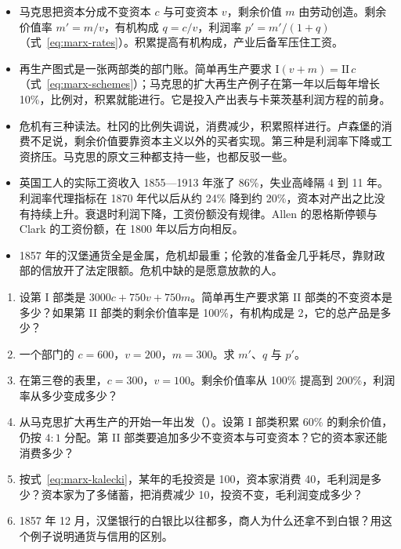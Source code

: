\begin{takeaways}
\begin{itemize}
\item 马克思把资本分成不变资本 $c$ 与可变资本 $v$，剩余价值 $m$ 由劳动创造。剩余价值率 $m'=m/v$，有机构成 $q=c/v$，利润率 $p'=m'/(1+q)$（式~\eqref{eq:marx-rates}）。积累提高有机构成，产业后备军压住工资。
\item 再生产图式是一张两部类的部门账。简单再生产要求 $\text{I}(v+m)=\text{II}\,c$（式~\eqref{eq:marx-schemes}）；马克思的扩大再生产例子在第一年以后每年增长 10\%，比例对，积累就能进行。它是投入产出表与卡莱茨基利润方程的前身。
\item 危机有三种读法。杜冈的比例失调说，消费减少，积累照样进行。卢森堡的消费不足说，剩余价值要靠资本主义以外的买者实现。第三种是利润率下降或工资挤压。马克思的原文三种都支持一些，也都反驳一些。
\item 英国工人的实际工资收入 1855—1913 年涨了 86\%，失业高峰隔 4 到 11 年。利润率代理指标在 1870 年代以后从约 24\% 降到约 20\%，资本对产出之比没有持续上升。衰退时利润下降，工资份额没有规律。Allen 的恩格斯停顿与 Clark 的工资份额，在 1800 年以后方向相反。
\item 1857 年的汉堡通货全是金属，危机却最重；伦敦的准备金几乎耗尽，靠财政部的信放开了法定限额。危机中缺的是愿意放款的人。
\end{itemize}
\end{takeaways}

\begin{selfcheck}
\begin{enumerate}
\item 设第 I 部类是 $3000c+750v+750m$。简单再生产要求第 II 部类的不变资本是多少？如果第 II 部类的剩余价值率是 100\%，有机构成是 2，它的总产品是多少？
\item 一个部门的 $c=600$，$v=200$，$m=300$。求 $m'$、$q$ 与 $p'$。
\item 在第三卷的表里，$c=300$，$v=100$。剩余价值率从 100\% 提高到 200\%，利润率从多少变成多少？
\item 从马克思扩大再生产的开始一年出发（）。设第 I 部类积累 60\% 的剩余价值，仍按 $4:1$ 分配。第 II 部类要追加多少不变资本与可变资本？它的资本家还能消费多少？
\item 按式~\eqref{eq:marx-kalecki}，某年的毛投资是 100，资本家消费 40，毛利润是多少？资本家为了多储蓄，把消费减少 10，投资不变，毛利润变成多少？
\item 1857 年 12 月，汉堡银行的白银比以往都多，商人为什么还拿不到白银？用这个例子说明通货与信用的区别。
\end{enumerate}
\end{selfcheck}

